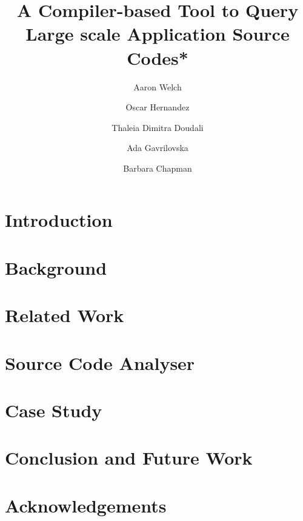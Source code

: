 \documentclass[letterpaper, 10 pt, conference]{ieeeconf}
\begin{document}
\title{\LARGE \bf
A Compiler-based Tool to Query Large scale Application Source Codes*
}
\author[1, 2]{Aaron Welch}
\author[1]{Oscar Hernandez}
\author[3]{Thaleia Dimitra Doudali}
\author[3]{Ada Gavrilovska}
\author[2]{Barbara Chapman}

\maketitle
\begin{abstract}

\end{abstract}
\section{Introduction}
\label{sec:intro}

\section{Background}
\label{sec:background}

\section{Related Work}
\label{sec:related}

\section{Source Code Analyser}
\label{sec:analysis}

\section{Case Study}
\label{sec:casestudy}

\section{Conclusion and Future Work}
\label{sec:conclusion}

\section*{Acknowledgements}
\label{sec:ack}



\end{document}
